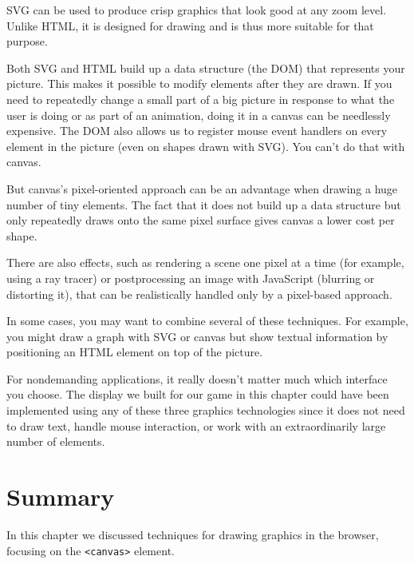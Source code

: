 SVG can be used to produce crisp graphics that look good at any zoom level. Unlike HTML, it is designed for drawing and is thus more suitable for that purpose.

Both SVG and HTML build up a data structure (the DOM) that represents your picture. This makes it possible to modify elements after they are drawn. If you need to repeatedly change a small part of a big picture in response to what the user is doing or as part of an animation, doing it in a canvas can be needlessly expensive. The DOM also allows us to register mouse event handlers on every element in the picture (even on shapes drawn with SVG). You can't do that with canvas.

But canvas's pixel-oriented approach can be an advantage when drawing a huge number of tiny elements. The fact that it does not build up a data structure but only repeatedly draws onto the same pixel surface gives canvas a lower cost per shape.

There are also effects, such as rendering a scene one pixel at a time (for example, using a ray tracer) or postprocessing an image with JavaScript (blurring or distorting it), that can be realistically handled only by a pixel-based approach.

In some cases, you may want to combine several of these techniques. For example, you might draw a graph with SVG or canvas but show textual information by positioning an HTML element on top of the picture.

For nondemanding applications, it really doesn't matter much which interface you choose. The display we built for our game in this chapter could have been implemented using any of these three graphics technologies since it does not need to draw text, handle mouse interaction, or work with an extraordinarily large number of elements.

\section{Summary}

In this chapter we discussed techniques for drawing graphics in the browser, focusing on the \lstinline`<canvas>` element.

